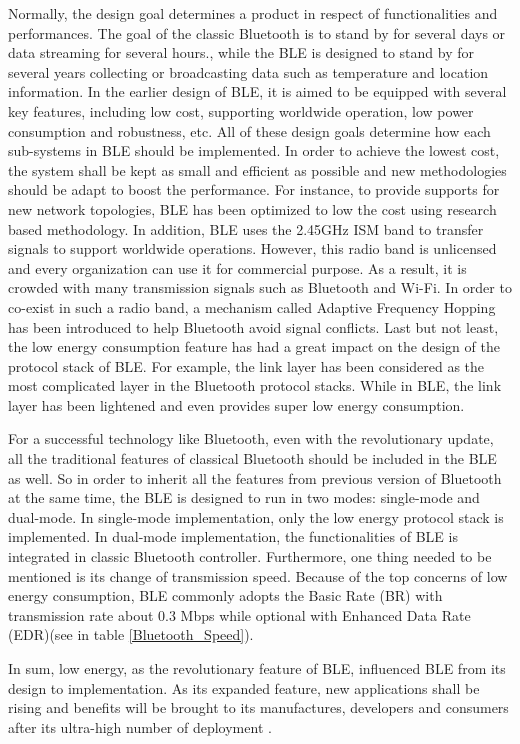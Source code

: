 \documentclass{cseminar}
\begin{document}
Normally, the design goal determines a product in respect of functionalities and performances. The goal of the classic Bluetooth is to stand by for several days or data streaming for several hours., while the BLE is designed to stand by for several years collecting or broadcasting data such as temperature and location information. In the earlier design of BLE, it is aimed to be equipped with several key features, including low cost, supporting worldwide operation, low power consumption and robustness, etc. All of these design goals determine how each sub-systems in BLE should be implemented. In order to achieve the lowest cost, the system shall be kept as small and efficient as possible and new methodologies should be adapt to boost the performance. For instance, to provide supports for new network topologies, BLE has been optimized to low the cost using research based methodology\cite{BLEDH}. In addition, BLE uses the 2.45GHz ISM band to transfer signals to support worldwide operations. However, this radio band is unlicensed and every organization can use it for commercial purpose. As a result, it is crowded with many transmission signals such as  Bluetooth and Wi-Fi. In order to co-exist in such a radio band, a mechanism called Adaptive Frequency Hopping has been introduced to help Bluetooth avoid signal conflicts. Last but not least, the low energy consumption feature has had a great impact on the design of the protocol stack of BLE. For example, the link layer has been considered as the most complicated layer in the Bluetooth protocol stacks. While in BLE, the link layer has been lightened and even provides super low energy consumption.

For a successful technology like Bluetooth, even with the revolutionary update, all the traditional features of classical Bluetooth should be included in the BLE as well. So in order to inherit all the features from previous version of Bluetooth at the same time, the BLE is designed to run in two modes: single-mode and dual-mode. In single-mode implementation, only the low energy protocol stack is implemented. In dual-mode implementation, the functionalities of BLE is integrated in classic Bluetooth controller\cite{BLEWiki}. Furthermore, one thing needed to be mentioned is its change of transmission speed. Because of the top concerns of low energy consumption, BLE commonly adopts the Basic Rate (BR) with transmission rate about 0.3 Mbps while optional with Enhanced Data Rate (EDR)(see in table \ref{Bluetooth_Speed}).

In sum, low energy, as the revolutionary feature of BLE, influenced BLE from its design to implementation. As its expanded feature, new applications shall be rising and benefits will be brought to its manufactures, developers and consumers after its ultra-high number of deployment \cite{BLE01}.
\end{document}
